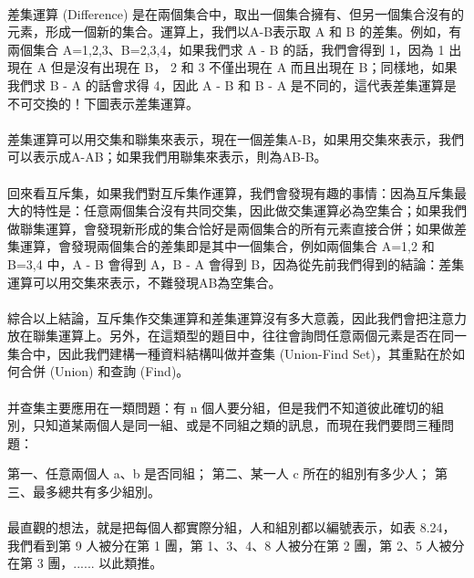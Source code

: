 \documentclass[12pt,a4paper,oneside]{report}
\begin{document}
\begin{CJK}{UTF8}{bkai}
\paragraph{}差集運算 (Difference) 是在兩個集合中，取出一個集合擁有、但另一個集合沒有的元素，形成一個新的集合。運算上，我們以A-B表示取 A 和 B 的差集。例如，有兩個集合 A={1,2,3}、B={2,3,4}，如果我們求 A - B 的話，我們會得到 {1}，因為 1 出現在 A 但是沒有出現在 B， 2 和 3 不僅出現在 A 而且出現在 B；同樣地，如果我們求 B - A 的話會求得 {4}，因此 A - B 和 B - A 是不同的，這代表差集運算是不可交換的！下圖表示差集運算。

\paragraph{}差集運算可以用交集和聯集來表示，現在一個差集A-B，如果用交集來表示，我們可以表示成A-AB；如果我們用聯集來表示，則為AB-B。

\paragraph{}回來看互斥集，如果我們對互斥集作運算，我們會發現有趣的事情：因為互斥集最大的特性是：任意兩個集合沒有共同交集，因此做交集運算必為空集合；如果我們做聯集運算，會發現新形成的集合恰好是兩個集合的所有元素直接合併；如果做差集運算，會發現兩個集合的差集即是其中一個集合，例如兩個集合 A={1,2} 和 B={3,4} 中，A - B 會得到 A，B - A 會得到 B，因為從先前我們得到的結論：差集運算可以用交集來表示，不難發現AB為空集合。

\paragraph{}綜合以上結論，互斥集作交集運算和差集運算沒有多大意義，因此我們會把注意力放在聯集運算上。另外，在這類型的題目中，往往會詢問任意兩個元素是否在同一集合中，因此我們建構一種資料結構叫做并查集 (Union-Find Set)，其重點在於如何合併 (Union) 和查詢 (Find)。

\paragraph{}并查集主要應用在一類問題：有 n 個人要分組，但是我們不知道彼此確切的組別，只知道某兩個人是同一組、或是不同組之類的訊息，而現在我們要問三種問題：

第一、任意兩個人 a、b 是否同組；
第二、某一人 c 所在的組別有多少人；
第三、最多總共有多少組別。

\paragraph{}最直觀的想法，就是把每個人都實際分組，人和組別都以編號表示，如表 8.24，我們看到第 9 人被分在第 1 團，第 1、3、4、8 人被分在第 2 團，第 2、5 人被分在第 3 團，...... 以此類推。



\end{CJK}
\end{document}
